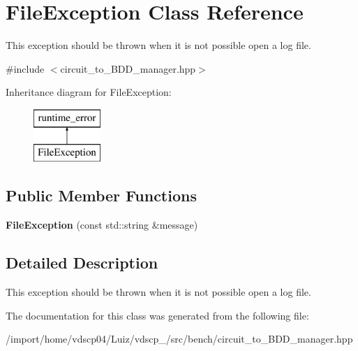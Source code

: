 \section{File\+Exception Class Reference}
\label{classFileException}


This exception should be thrown when it is not possible open a log file.  




{\ttfamily \#include $<$circuit\+\_\+to\+\_\+\+B\+D\+D\+\_\+manager.\+hpp$>$}

Inheritance diagram for File\+Exception\+:\begin{figure}[H]
\begin{center}
\leavevmode
\includegraphics[height=2.000000cm]{classFileException}
\end{center}
\end{figure}
\subsection*{Public Member Functions}
\begin{DoxyCompactItemize}
\item 
{\bfseries File\+Exception} (const std\+::string \&message)\label{classFileException_a0d1f9f85f7fd4b70c619f80602ad1146}

\end{DoxyCompactItemize}


\subsection{Detailed Description}
This exception should be thrown when it is not possible open a log file. 

The documentation for this class was generated from the following file\+:\begin{DoxyCompactItemize}
\item 
/import/home/vdscp04/\+Luiz/vdscp\+\_/src/bench/circuit\+\_\+to\+\_\+\+B\+D\+D\+\_\+manager.\+hpp\end{DoxyCompactItemize}
